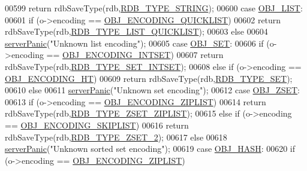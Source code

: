 \begin{DoxyCode}
{{{{{{{{00599         \textcolor{keywordflow}{return} rdbSaveType(rdb,\hyperlink{rdb_8h_ab64d2f599807d211a63337781c241c41}{RDB\_TYPE\_STRING});
00600     \textcolor{keywordflow}{case} \hyperlink{server_8h_a4a5f22a280949c97a0cb0d4213275126}{OBJ\_LIST}:
00601         \textcolor{keywordflow}{if} (o->encoding == \hyperlink{server_8h_aec792aeed6d4bf83966672e6a23043b8}{OBJ\_ENCODING\_QUICKLIST})
00602             \textcolor{keywordflow}{return} rdbSaveType(rdb,\hyperlink{rdb_8h_a391dc0622a3b5f1b3b10c5b5e59eb095}{RDB\_TYPE\_LIST\_QUICKLIST});
00603         \textcolor{keywordflow}{else}
00604             \hyperlink{server_8h_a11cc378e7778a830b41240578de3b204}{serverPanic}(\textcolor{stringliteral}{"Unknown list encoding"});
00605     \textcolor{keywordflow}{case} \hyperlink{server_8h_a8d179375a4aac33d3fa7aa80c8ccc75f}{OBJ\_SET}:
00606         \textcolor{keywordflow}{if} (o->encoding == \hyperlink{server_8h_a214173987de21c3b7661fddd42b05873}{OBJ\_ENCODING\_INTSET})
00607             \textcolor{keywordflow}{return} rdbSaveType(rdb,\hyperlink{rdb_8h_a0a267bc10fe879463d503d5182865b86}{RDB\_TYPE\_SET\_INTSET});
00608         \textcolor{keywordflow}{else} \textcolor{keywordflow}{if} (o->encoding == \hyperlink{server_8h_a9c10219f68afc557d510d108257d238b}{OBJ\_ENCODING\_HT})
00609             \textcolor{keywordflow}{return} rdbSaveType(rdb,\hyperlink{rdb_8h_a164174151582b9f8ce35cda22215abf5}{RDB\_TYPE\_SET});
00610         \textcolor{keywordflow}{else}
00611             \hyperlink{server_8h_a11cc378e7778a830b41240578de3b204}{serverPanic}(\textcolor{stringliteral}{"Unknown set encoding"});
00612     \textcolor{keywordflow}{case} \hyperlink{server_8h_a8c356422ddbc03bd77694880a30a1953}{OBJ\_ZSET}:
00613         \textcolor{keywordflow}{if} (o->encoding == \hyperlink{server_8h_aabf064ede983103f1fd0df2086e84eee}{OBJ\_ENCODING\_ZIPLIST})
00614             \textcolor{keywordflow}{return} rdbSaveType(rdb,\hyperlink{rdb_8h_a844a39336653d28b5a222404cb4a5bd2}{RDB\_TYPE\_ZSET\_ZIPLIST});
00615         \textcolor{keywordflow}{else} \textcolor{keywordflow}{if} (o->encoding == \hyperlink{server_8h_acfb35db5cb30ed113ed23aeb1a224c4c}{OBJ\_ENCODING\_SKIPLIST})
00616             \textcolor{keywordflow}{return} rdbSaveType(rdb,\hyperlink{rdb_8h_adc645c9007ce7ce91f18bc88a7ea6918}{RDB\_TYPE\_ZSET\_2});
00617         \textcolor{keywordflow}{else}
00618             \hyperlink{server_8h_a11cc378e7778a830b41240578de3b204}{serverPanic}(\textcolor{stringliteral}{"Unknown sorted set encoding"});
00619     \textcolor{keywordflow}{case} \hyperlink{server_8h_a87c05ba4f7f36741864277f02a4423fb}{OBJ\_HASH}:
00620         \textcolor{keywordflow}{if} (o->encoding == \hyperlink{server_8h_aabf064ede983103f1fd0df2086e84eee}{OBJ\_ENCODING\_ZIPLIST})
}}}}}}}}
\end{DoxyCode}

